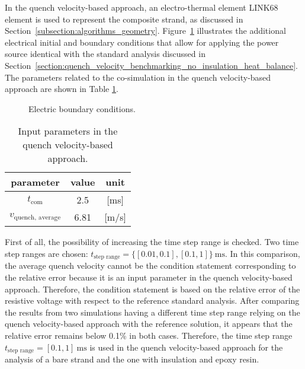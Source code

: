 
In the quench velocity-based approach, an electro-thermal element LINK68 element is used to represent the composite strand, as discussed in Section~\ref{subsection:algorithms_geometry}. Figure~\ref{fig: q_vel_benchmarking_electrical_settings} illustrates the additional electrical initial and boundary conditions that allow for applying the power source identical with the standard analysis discussed in Section~\ref{section:quench_velocity_benchmarking_no_insulation_heat_balance}. The parameters related to the co-simulation in the quench velocity-based approach are shown in Table \ref{table: 1d_qv_benchmarking_geometry_parameters_quench_velocity}. 

\begin{figure}[H]
\centering
{}
\caption{Electric boundary conditions.}
\label{fig: q_vel_benchmarking_electrical_settings}
\end{figure}

\begin{table}[H]
    \caption{Input parameters in the quench velocity-based approach.} 
    \vspace{-1.em} 
    \fontsize{10}{10}
    \selectfont 
    \renewcommand{\arraystretch}{1.5}
    \begin{center}
        \begin{tabular}{ ccc }  
        \hline
        parameter & value & unit \\
        \hline
        $t_\text{com}$ & 2.5 & [ms] \\
        $v_\text{quench, average}$ & 6.81 & [m/s] \\
        \hline 
        \end{tabular}
    \end{center}  
     \label{table: 1d_qv_benchmarking_geometry_parameters_quench_velocity} 
 \end{table}

First of all, the possibility of increasing the time step range is checked. Two time step ranges are chosen: $t_\text{step range}=\{[0.01, 0.1], [0.1, 1]\}~\text{ms}$. In this comparison, the average quench velocity cannot be the condition statement corresponding to the relative error because it is an input parameter in the quench velocity-based approach. Therefore, the condition statement is based on the relative error of the resistive voltage with respect to the reference standard analysis. After comparing the results from two simulations having a different time step range relying on the quench velocity-based approach with the reference solution, it appears that the relative error remains below 0.1\% in both cases. Therefore, the time step range $t_\text{step range}=[0.1, 1]~\text{ms}$ is used in the quench velocity-based approach for the analysis of a bare strand and the one with insulation and epoxy resin.


